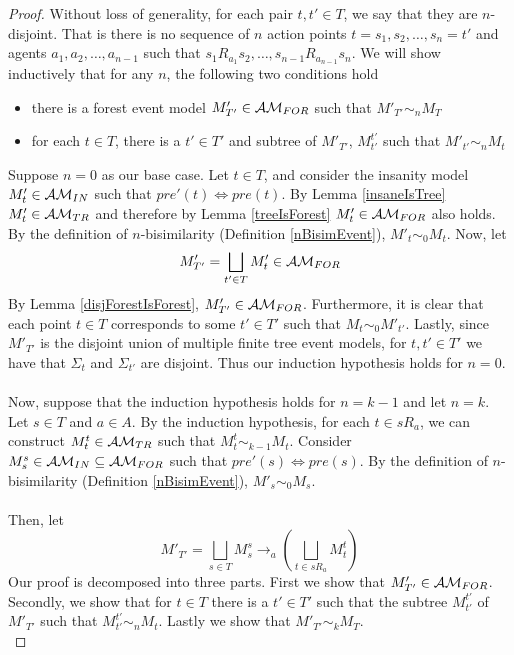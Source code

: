 \begin{proof}
Without loss of generality, for each pair $t, t' \in T$, we say that they are
$n$-disjoint.
That is there is no sequence of $n$ action points $t = s_1, s_2, \ldots,
s_n = t'$ and agents $a_1, a_2, \ldots, a_{n-1}$ such that $s_1 R_{a_1} s_2,
    \ldots, s_{n-1} R_{a_{n-1}} s_n$.
We will show inductively that for any $n$, the following two conditions hold
\begin{itemize}
\item there is a forest event model $M'_{T'} \in \mathcal{AM}_{FOR}$ such that $M'_{T'} \sim_n M_T$
\item for each $t \in T$, there is a $t' \in T'$ and subtree of $M'_{T'}$, $M^{t'}_{t'}$ such that
$M'_{t'} \sim_n M_t$
\end{itemize}
Suppose $n = 0$ as our base case.
Let $t \in T$, and consider the insanity model $M'_{t} \in \mathcal{AM}_{IN}$ such that $pre'(t) \iff
pre(t)$.
By Lemma \ref{insaneIsTree} $M'_{t} \in \mathcal{AM}_{TR}$ and therefore by Lemma \ref{treeIsForest}
$M'_{t} \in \mathcal{AM}_{FOR}$ also holds.
By the definition of $n$-bisimilarity (Definition \ref{nBisimEvent}), $M'_{t}
\sim_0 M_t$.
Now, let
\[
  M'_{T'} = \bigsqcup_{t' \in T} M'_{t} \in \mathcal{AM}_{FOR}
\]
By Lemma \ref{disjForestIsForest}, $M'_{T'} \in \mathcal{AM}_{FOR}$.
Furthermore, it is clear that each point $t \in T$ corresponds to some $t' \in T'$ such that $M_t
\sim_0 M'_{t'}$.
Lastly, since $M'_{T'}$ is the disjoint union of multiple finite tree event models, for $t, t' \in
T'$ we have that $\Sigma_t$ and $\Sigma_{t'}$ are disjoint.
Thus our induction hypothesis holds for $n = 0$.\\
\\
Now, suppose that the induction hypothesis holds for $n = k-1$ and let $n = k$.
Let $s \in T$ and $a \in A$.
By the induction hypothesis, for each $t \in s R_a$, we can construct $M^t_t \in \mathcal{AM}_{TR}$ such that
$M^t_t \sim_{k-1} M_t$.
Consider $M^s_s \in \mathcal{AM}_{IN} \subseteq \mathcal{AM}_{FOR}$ such that $pre'(s) \iff
pre(s)$.
By the definition of $n$-bisimilarity (Definition \ref{nBisimEvent}), $M'_{s}
\sim_0 M_s$.\\
\\
Then, let
\[
  M'_{T'} = \bigsqcup_{s \in T} M^s_s \to_a (\bigsqcup_{t \in s R_a} M^t_{t})
\]
Our proof is decomposed into three parts.
First we show that $M'_{T'} \in \mathcal{AM}_{FOR}$.
Secondly, we show that for $t \in T$ there is a $t' \in T'$ such that the subtree $M^{t'}_{t'}$ of
$M'_{T'}$ such that $M^{t'}_{t'} \sim_n M_t$.
Lastly we show that $M'_{T'} \sim_k M_T$.\\

\end{proof}
